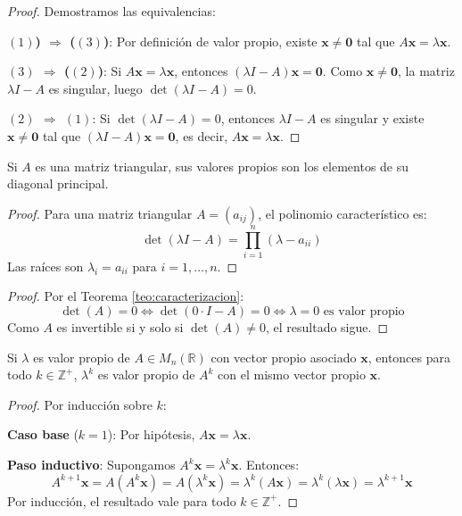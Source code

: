 \begin{proof}
Demostramos las equivalencias:

\textbf{$(1)$) $\Rightarrow$ ($(3)$)}: Por definición de valor propio, existe $\mathbf{x} \neq \mathbf{0}$ tal que $A\mathbf{x} = \lambda\mathbf{x}$.

\textbf{$(3)$ $\Rightarrow$ ($(2)$)}: Si $A\mathbf{x} = \lambda\mathbf{x}$, entonces $(\lambda I - A)\mathbf{x} = \mathbf{0}$. Como $\mathbf{x} \neq \mathbf{0}$, la matriz $\lambda I - A$ es singular, luego $\det(\lambda I - A) = 0$.

\textbf{$(2)$ $\Rightarrow$ $(1)$}: Si $\det(\lambda I - A) = 0$, entonces $\lambda I - A$ es singular y existe $\mathbf{x} \neq \mathbf{0}$ tal que $(\lambda I - A)\mathbf{x} = \mathbf{0}$, es decir, $A\mathbf{x} = \lambda\mathbf{x}$.
\end{proof}

\begin{coro}\label{cor:triangular}
Si $A$ es una matriz triangular, sus valores propios son los elementos de su diagonal principal.
\end{coro}

\begin{proof}
Para una matriz triangular $A = (a_{ij})$, el polinomio característico es:
\[
\det(\lambda I - A) = \prod_{i=1}^n (\lambda - a_{ii})
\]
Las raíces son $\lambda_i = a_{ii}$ para $i=1,\dots,n$.
\end{proof}


\begin{proof}
Por el Teorema \ref{teo:caracterizacion}: 
\[
\det(A) = 0 \iff \det(0 \cdot I - A) = 0 \iff \lambda = 0 \text{ es valor propio}
\]
Como $A$ es invertible si y solo si $\det(A) \neq 0$, el resultado sigue.
\end{proof}

\begin{theorem}\label{teo:potencia}
Si $\lambda$ es valor propio de $A \in M_n(\mathbb{R})$ con vector propio asociado $\mathbf{x}$, entonces para todo $k \in \mathbb{Z}^+$, $\lambda^k$ es valor propio de $A^k$ con el mismo vector propio $\mathbf{x}$.
\end{theorem}

\begin{proof}
Por inducción sobre $k$:

\textbf{Caso base} ($k=1$): Por hipótesis, $A\mathbf{x} = \lambda\mathbf{x}$.

\textbf{Paso inductivo}: Supongamos $A^k\mathbf{x} = \lambda^k\mathbf{x}$. Entonces:
\[
A^{k+1}\mathbf{x} = A(A^k\mathbf{x}) = A(\lambda^k\mathbf{x}) = \lambda^k(A\mathbf{x}) = \lambda^k(\lambda\mathbf{x}) = \lambda^{k+1}\mathbf{x}
\]
Por inducción, el resultado vale para todo $k \in \mathbb{Z}^+$.
\end{proof}

